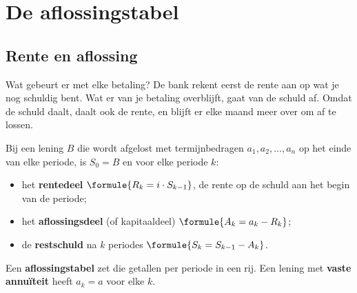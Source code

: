 
\begin{oefeningen}
\end{oefeningen}

\section{De aflossingstabel}

\subsection{Rente en aflossing}

Wat gebeurt er met elke betaling? De bank rekent eerst de rente aan op wat je nog schuldig bent. Wat er van je betaling overblijft, gaat van de schuld af. Omdat de schuld daalt, daalt ook de rente, en blijft er elke maand meer over om af te lossen.

\begin{theorie}
Bij een lening $B$ die wordt afgelost met termijnbedragen $a_1, a_2, \ldots, a_n$ op het einde van elke periode, is $S_0 = B$ en voor elke periode $k$:
\begin{itemize}
\item het \textbf{\textcolor{accent}{rentedeel}} $\formule{R_k = i \cdot S_{k-1}}$, de rente op de schuld aan het begin van de periode;
\item het \textbf{\textcolor{accent}{aflossingsdeel}} (of kapitaaldeel) $\formule{A_k = a_k - R_k}$;
\item de \textbf{\textcolor{accent}{restschuld}} na $k$ periodes $\formule{S_k = S_{k-1} - A_k}$.
\end{itemize}
Een \textbf{\textcolor{accent}{aflossingstabel}} zet die getallen per periode in een rij. Een lening met \textbf{\textcolor{accent}{vaste annuïteit}} heeft $a_k = a$ voor elke $k$.
\end{theorie}

